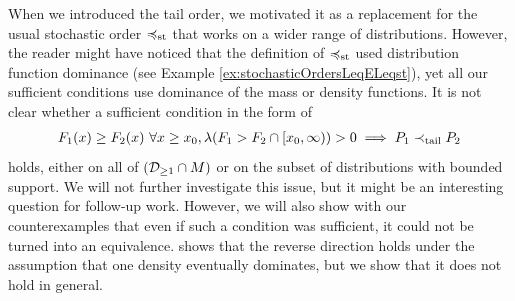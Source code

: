 \documentclass[a4paper,DIV=11,abstracton,twoside=semi]{scrreprt}
\theoremstyle{definition}
\begin{document}
    When we introduced the tail order, we motivated it as a replacement for the usual stochastic order $\preccurlyeq_{\text{st}}$ that works on a wider range of distributions.
    However, the reader might have noticed that the definition of $\preccurlyeq_{\text{st}}$ used distribution function dominance (see Example \ref{ex:stochasticOrdersLeqELeqst}), yet all our sufficient conditions use dominance of the mass or density functions.
    It is not clear whether a sufficient condition in the form of 
    \begin{gather*}
        F_1(x) \geq F_2(x) ~ \forall x \geq x_0, \lambda({F_1 > F_2} \cap [x_0, \infty)) > 0 \implies P_1 \prec_{\text{tail}} P_2
    \end{gather*}
    holds, either on all of $(\mathcal{D}_{\geq1} \cap M)$ or on the subset of distributions with bounded support.
    We will not further investigate this issue, but it might be an interesting question for follow-up work.
    However, we will also show with our counterexamples that even if such a condition was sufficient, it could not be turned into an equivalence.
    \cite[Theorem 2.15]{bib:rassGameRiskManagI} shows that the reverse direction holds under the assumption that one density eventually dominates, but we show that it does not hold in general.
    
\end{document}
